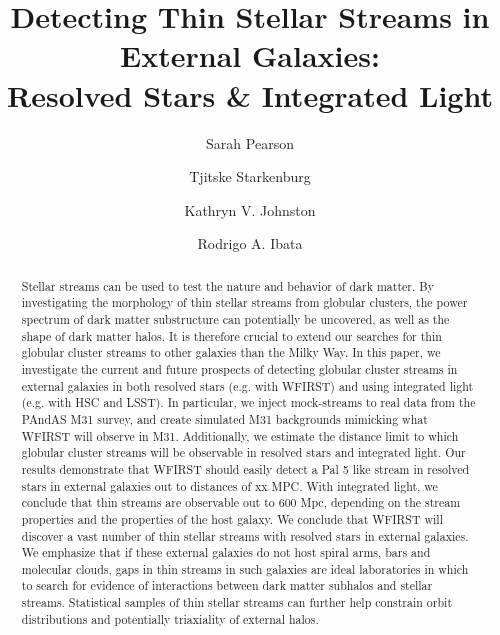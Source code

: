 \documentclass[twocolumn]{aastex62}
\begin{document}
\sloppy\sloppypar\raggedbottom\frenchspacing %
\title{Detecting Thin Stellar Streams in External Galaxies:\\ Resolved Stars \& Integrated Light}


 \author{Sarah Pearson}

\author{Tjitske Starkenburg}

\author{Kathryn V. Johnston}

\author{Rodrigo A. Ibata}

\begin{abstract}\noindent 
Stellar streams can be used to test the nature and behavior of dark matter. By investigating the morphology of thin stellar streams from globular clusters, the 
power spectrum of dark matter substructure can potentially be uncovered, as well as the shape of dark matter halos. It is therefore crucial to extend our searches for thin globular cluster streams to other galaxies than the Milky Way. In this paper, we investigate the current and future prospects of detecting globular cluster streams in external galaxies in both resolved stars (e.g. with WFIRST) and using integrated light (e.g. with HSC and LSST). In particular, we inject mock-streams to real data from the PAndAS M31 survey, and create simulated M31 backgrounds mimicking what WFIRST will observe in M31. Additionally, we estimate the distance limit to which globular cluster streams will be observable in resolved stars and integrated light. Our results demonstrate that  WFIRST should easily detect a Pal 5 like stream in resolved stars in external galaxies out to distances of xx MPC. With integrated light, we conclude that thin streams are observable out to 600 Mpc, depending on the stream properties and the properties of the host galaxy. We conclude that WFIRST will discover a vast number of thin stellar streams with resolved stars in external galaxies. We emphasize that if these external galaxies do not host spiral arms, bars and molecular clouds, gaps in thin streams in such galaxies are ideal laboratories in which to search for evidence of interactions between dark matter subhalos and stellar streams. Statistical samples of thin stellar streams can further help constrain orbit distributions and potentially triaxiality of external halos. 

\end{abstract}
\end{document}
